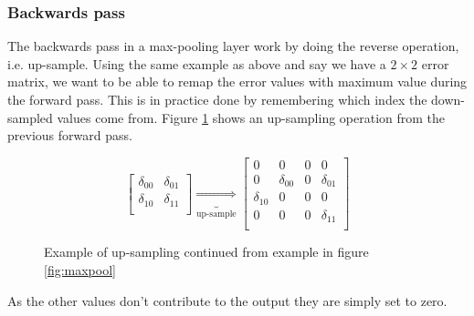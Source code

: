 \subsubsection{Backwards pass}
The backwards pass in a max-pooling layer work by doing the reverse operation,
i.e. up-sample. Using the same example as above and say we have a $2 \times 2$ 
error matrix, we want to be able to remap the error values with maximum value
during the forward pass. This is in practice done by remembering which index the
down-sampled values come from. Figure \ref{upsample} shows an up-sampling
operation from the previous forward pass. 
\begin{figure}[!hbtp]
	\begin{displaymath}
	\begin{bmatrix}
	\delta_{00} & \delta_{01} \\ 
	\delta_{10} & \delta_{11}  \\  
	\end{bmatrix}
	\underbrace{\Rightarrow}_{\text{up-sample}}
	\begin{bmatrix}
	0 & 0 & 0 & 0 \\ 
	0 & \delta_{00} & 0 & \delta_{01} \\ 
	\delta_{10} & 0 & 0 & 0 \\ 
	0 & 0 & 0 & \delta_{11}  \\  
	\end{bmatrix}
	\end{displaymath}
	\caption{Example of up-sampling continued from example in figure
		\ref{fig:maxpool}}
	\label{upsample}
\end{figure} \newline 
As the other values don't contribute to the output they are simply set to zero. 

